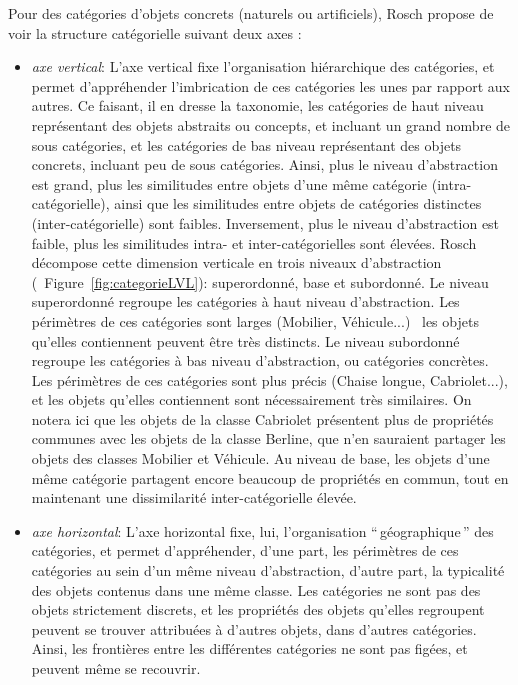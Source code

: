 Pour des catégories d'objets concrets (naturels ou artificiels), Rosch propose de voir la structure catégorielle suivant deux axes \citep[p. 30-41]{rosch1978cognition}:

\begin{itemize}
\item \textit{axe vertical}: L'axe vertical fixe l'organisation hiérarchique des catégories, et permet d'appréhender l'imbrication de ces catégories les unes par rapport aux autres. Ce faisant, il en dresse la taxonomie, les catégories de haut niveau représentant des objets abstraits ou concepts, et incluant un grand nombre de sous catégories, et les catégories de bas niveau représentant des objets concrets, incluant peu de sous catégories. Ainsi, plus le niveau d'abstraction est grand, plus les similitudes entre objets d'une même catégorie (intra-catégorielle), ainsi que les similitudes entre objets de catégories distinctes (inter-catégorielle) sont faibles. Inversement, plus le niveau d'abstraction est faible, plus les similitudes intra- et inter-catégorielles sont élevées. Rosch décompose cette dimension verticale en trois niveaux d'abstraction (\cf~Figure~\ref{fig:categorieLVL}): superordonné, base et subordonné. Le niveau superordonné regroupe les catégories à haut niveau d'abstraction. Les périmètres de ces catégories sont larges (Mobilier, Véhicule...) \ie~les objets qu'elles contiennent peuvent être très distincts. Le niveau subordonné regroupe les catégories à bas niveau d'abstraction, ou catégories concrètes. Les périmètres de ces catégories sont plus précis (Chaise longue, Cabriolet...), et les objets qu'elles contiennent sont nécessairement très similaires. On notera ici que les objets de la classe Cabriolet présentent plus de propriétés communes avec les objets de la classe Berline, que n'en sauraient partager les objets des classes Mobilier et Véhicule. Au niveau de base, les objets d'une même catégorie partagent encore beaucoup de propriétés en commun, tout en maintenant une dissimilarité inter-catégorielle élevée.
\item \textit{axe horizontal}: L'axe horizontal fixe, lui, l'organisation ``\,géographique\,'' des catégories, et permet d'appréhender, d'une part, les périmètres de ces catégories au sein d'un même niveau d'abstraction, d'autre part, la typicalité des objets contenus dans une même classe. Les catégories ne sont pas des objets strictement discrets, et les propriétés des objets qu'elles regroupent peuvent se trouver attribuées à d'autres objets, dans d'autres catégories. Ainsi, les frontières entre les différentes catégories ne sont pas figées, et peuvent même se recouvrir.
\end{itemize}

